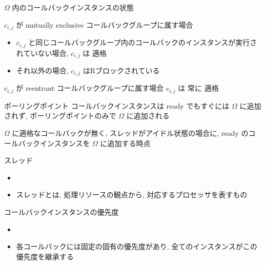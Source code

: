 \begin{frame}{$\Omega$ 内のコールバックインスタンスの状態}
    \begin{block}{$c_{i, j}$ が mutually exclusive コールバックグループに属す場合}
        \setlength{\linewidth}{0.98\columnwidth}
        \begin{itemize}
            \item $c_{i, j}$ と同じコールバックグループ内のコールバックのインスタンスが実行されていない場合, $c_{i, j}$ は 適格
            \item それ以外の場合, $c_{i, j}$ はRブロックされている
        \end{itemize}
    \end{block}
    \begin{block}{$c_{i, j}$ が reentrant コールバックグループに属す場合}
        $c_{i, j}$ は 常に 適格
    \end{block}
\end{frame}

\begin{frame}{ポーリングポイント}
    コールバックインスタンスは ready でもすぐには $\Omega$ に追加されず, ポーリングポイントのみで $\Omega$ に追加される
    \begin{definition}[ポーリングポイント]
        $\Omega$ に適格なコールバックが無く, スレッドがアイドル状態の場合に, ready のコールバックインスタンスを $\Omega$ に追加する時点
    \end{definition}
\end{frame}

\begin{frame}{スレッド}
    \begin{itemize}
        \item {}
        \item スレッドとは, 処理リソースの観点から, 対応するプロセッサを表すもの
    \end{itemize}
\end{frame}

\begin{frame}{コールバックインスタンスの優先度}
    \begin{itemize}
        \item {}
        \item 各コールバックには固定の固有の優先度があり, 全てのインスタンスがこの優先度を継承する
    \end{itemize}
\end{frame}


